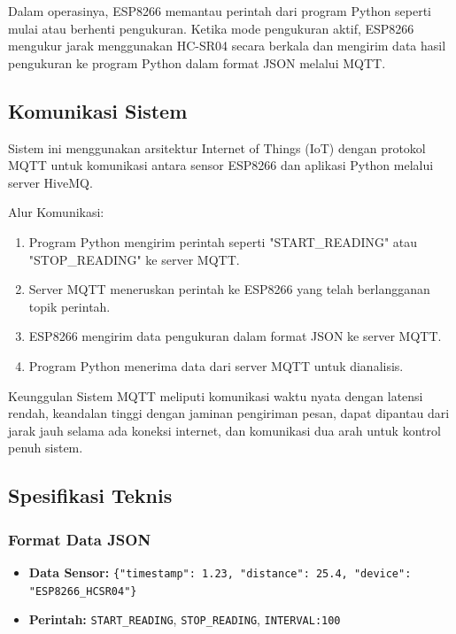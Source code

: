 Dalam operasinya, ESP8266 memantau perintah dari program Python seperti mulai atau berhenti pengukuran. Ketika mode pengukuran aktif, ESP8266 mengukur jarak menggunakan HC-SR04 secara berkala dan mengirim data hasil pengukuran ke program Python dalam format JSON melalui MQTT.

\newpage

\subsection{Komunikasi Sistem}

Sistem ini menggunakan arsitektur Internet of Things (IoT) dengan protokol MQTT untuk komunikasi antara sensor ESP8266 dan aplikasi Python melalui server HiveMQ.

Alur Komunikasi:

\begin{enumerate}
\item Program Python mengirim perintah seperti "START\_READING" atau "STOP\_READING" ke server MQTT.

\item Server MQTT meneruskan perintah ke ESP8266 yang telah berlangganan topik perintah.

\item ESP8266 mengirim data pengukuran dalam format JSON ke server MQTT.

\item Program Python menerima data dari server MQTT untuk dianalisis.
\end{enumerate}

Keunggulan Sistem MQTT meliputi komunikasi waktu nyata dengan latensi rendah, keandalan tinggi dengan jaminan pengiriman pesan, dapat dipantau dari jarak jauh selama ada koneksi internet, dan komunikasi dua arah untuk kontrol penuh sistem.

\subsection{Spesifikasi Teknis}

\subsubsection{Format Data JSON}
\begin{itemize}
    \item \textbf{Data Sensor:} \texttt{\{"timestamp": 1.23, "distance": 25.4, "device": "ESP8266\_HCSR04"\}}
    \item \textbf{Perintah:} \texttt{START\_READING}, \texttt{STOP\_READING}, \texttt{INTERVAL:100}
\end{itemize}

